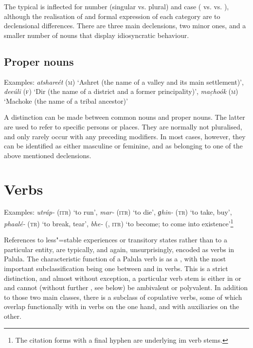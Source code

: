 The typical  is inflected for number (singular vs. plural) and case ( vs.  vs. ), although the realisation of and formal expression of each category are  to declensional differences. There are three main declensions, two minor ones, and a smaller number of nouns that display idiosyncratic  behaviour.


\subsection{Proper nouns}
\label{subsec:3b-2-1}
Examples: \textit{atshareét} (\textsc{m}) `Ashret (the name of a valley and its main settlement)', \textit{deeúli} (\textsc{f}) `Dir (the name of a district and a former principality)', \textit{mac̣hoók} (\textsc{m}) `Machoke (the name of a tribal ancestor)'


A distinction can be made between common nouns and proper nouns. The latter are used to refer to specific persons or places. They are normally not pluralised, and only rarely occur with any preceding modifiers. In most cases, however, they can be identified as either masculine or feminine, and as belonging to one of the above mentioned declensions.

\section{Verbs}
\label{sec:3b-3}

Examples: \textit{utráp-} (\textsc{itr}) `to run', \textit{mar-} (\textsc{itr}) `to die', \textit{ɡhin-} (\textsc{tr}) `to take, buy', \textit{phaalé-} (\textsc{tr}) `to break, tear', \textit{bhe-} (, \textsc{itr}) `to become; to come into existence'\footnote{The citation forms with a final hyphen are underlying im verb stems.}


References to less"=stable experiences or transitory states rather than to a particular entity, are typically, and again, unsurprisingly, encoded as verbs in Palula. The characteristic function of a Palula verb is as a , with the most important subclassification being one between  and in verbs. This is a strict distinction, and almost without exception, a particular verb stem is either in or  and cannot (without further , see below) be ambivalent or polyvalent. In addition to those two main classes, there is a subclass of copulative verbs, some of which overlap functionally with in verbs on the one hand, and with auxiliaries on the other.


